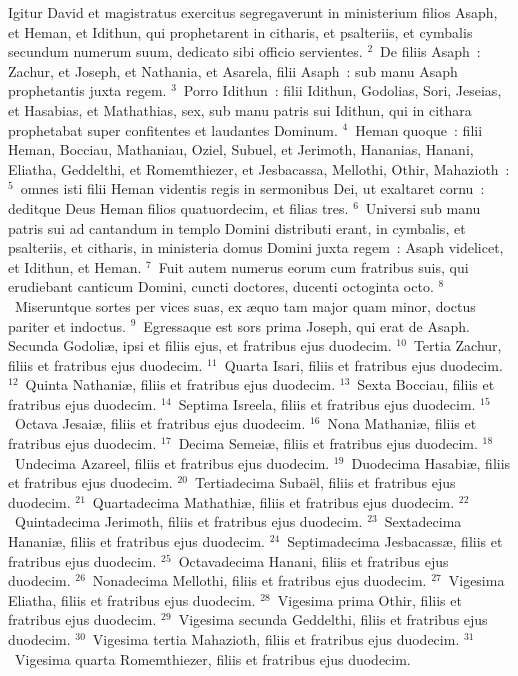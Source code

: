 \bchapter
\lettrine[lines=3,image=true,loversize=0.05,lraise=-0.03]{I}{}gitur David et magistratus exercitus segregaverunt in ministerium filios Asaph, et Heman, et Idithun, qui prophetarent in citharis, et psalteriis, et cymbalis secundum numerum suum, dedicato sibi officio servientes.
${}^{2}$~De filiis Asaph~: Zachur, et Joseph, et Nathania, et Asarela, filii Asaph~: sub manu Asaph prophetantis juxta regem.
${}^{3}$~Porro Idithun~: filii Idithun, Godolias, Sori, Jeseias, et Hasabias, et Mathathias, sex, sub manu patris sui Idithun, qui in cithara prophetabat super confitentes et laudantes Dominum.
${}^{4}$~Heman quoque~: filii Heman, Bocciau, Mathaniau, Oziel, Subuel, et Jerimoth, Hananias, Hanani, Eliatha, Geddelthi, et Romemthiezer, et Jesbacassa, Mellothi, Othir, Mahazioth~:
${}^{5}$~omnes isti filii Heman videntis regis in sermonibus Dei, ut exaltaret cornu~: deditque Deus Heman filios quatuordecim, et filias tres.
${}^{6}$~Universi sub manu patris sui ad cantandum in templo Domini distributi erant, in cymbalis, et psalteriis, et citharis, in ministeria domus Domini juxta regem~: Asaph videlicet, et Idithun, et Heman.
${}^{7}$~Fuit autem numerus eorum cum fratribus suis, qui erudiebant canticum Domini, cuncti doctores, ducenti octoginta octo.
${}^{8}$~Miseruntque sortes per vices suas, ex \ae quo tam major quam minor, doctus pariter et indoctus.
${}^{9}$~Egressaque est sors prima Joseph, qui erat de Asaph. Secunda Godoli\ae , ipsi et filiis ejus, et fratribus ejus duodecim.
${}^{10}$~Tertia Zachur, filiis et fratribus ejus duodecim.
${}^{11}$~Quarta Isari, filiis et fratribus ejus duodecim.
${}^{12}$~Quinta Nathani\ae , filiis et fratribus ejus duodecim.
${}^{13}$~Sexta Bocciau, filiis et fratribus ejus duodecim.
${}^{14}$~Septima Isreela, filiis et fratribus ejus duodecim.
${}^{15}$~Octava Jesai\ae , filiis et fratribus ejus duodecim.
${}^{16}$~Nona Mathani\ae , filiis et fratribus ejus duodecim.
${}^{17}$~Decima Semei\ae , filiis et fratribus ejus duodecim.
${}^{18}$~Undecima Azareel, filiis et fratribus ejus duodecim.
${}^{19}$~Duodecima Hasabi\ae , filiis et fratribus ejus duodecim.
${}^{20}$~Tertiadecima Suba\"el, filiis et fratribus ejus duodecim.
${}^{21}$~Quartadecima Mathathi\ae , filiis et fratribus ejus duodecim.
${}^{22}$~Quintadecima Jerimoth, filiis et fratribus ejus duodecim.
${}^{23}$~Sextadecima Hanani\ae , filiis et fratribus ejus duodecim.
${}^{24}$~Septimadecima Jesbacass\ae , filiis et fratribus ejus duodecim.
${}^{25}$~Octavadecima Hanani, filiis et fratribus ejus duodecim.
${}^{26}$~Nonadecima Mellothi, filiis et fratribus ejus duodecim.
${}^{27}$~Vigesima Eliatha, filiis et fratribus ejus duodecim.
${}^{28}$~Vigesima prima Othir, filiis et fratribus ejus duodecim.
${}^{29}$~Vigesima secunda Geddelthi, filiis et fratribus ejus duodecim.
${}^{30}$~Vigesima tertia Mahazioth, filiis et fratribus ejus duodecim.
${}^{31}$~Vigesima quarta Romemthiezer, filiis et fratribus ejus duodecim.

